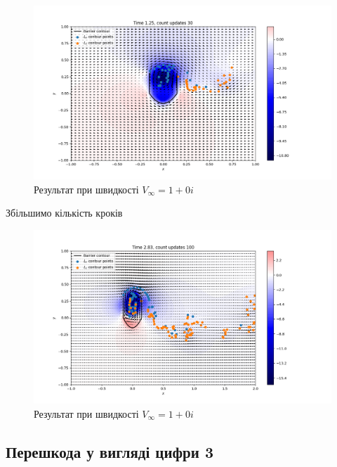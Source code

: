 \documentclass[a4paper,12pt]{article}
\begin{document}
	\begin{figure}[h]
		\begin{center}\includegraphics[scale=0.5]{U_form_30} \end{center}
		\caption{Результат при швидкості $V_{\infty} = 1 +0i$}
		\label{fig:result_one1}
	\end{figure}

	Збільшимо кількість кроків
	
	\begin{figure}[ht]
		\begin{center}\includegraphics[scale=0.5]{U_form_100} \end{center}
		\caption{Результат при швидкості $V_{\infty} = 1 +0i$}
		\label{fig:result_one2}
	\end{figure}

	
	\newpage
	\subsection{Перешкода у вигляді цифри 3}
	
\end{document}
